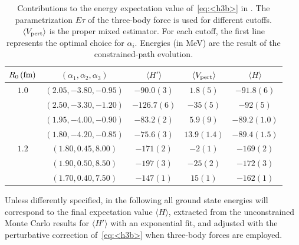 \documentclass[aps,prc,twocolumn,superscriptaddress,floatfix]{revtex4-1}
\begin{document}
\setlength{\tabcolsep}{1.5pt}
\begin{table}[htb]
\centering
\caption[]{Contributions to the energy expectation value of~\cref{eq:<h3b>} in .
The parametrization $E\tau$ of the three-body force is used for different cutoffs.
$\langle V_{\rm pert}\rangle$ is the proper mixed estimator. 
For each cutoff, the first line represents the optimal choice for $\alpha_i$.
Energies (in MeV) are the result of the constrained-path evolution.}
\begin{tabular}{ccccc}
\hline\hline
$R_0\,(\rm fm)$ & $(\alpha_1,\alpha_2,\alpha_3)$ & $\langle H'\rangle$ & $\langle V_{\rm pert}\rangle$ & $\langle H\rangle$ \\
\hline
$1.0$ & $(2.05,-3.80,-0.95)$ & $-90.0(3)$  & $1.8(5)$    & $-91.8(6)$   \\
      & $(2.50,-3.30,-1.20)$ & $-126.7(6)$ & $-35(5)$    & $-92(5)$     \\
      & $(1.95,-4.00,-0.90)$ & $-83.2(2)$  & $5.9(9)$    & $-89.2(1.0)$ \\
      & $(1.80,-4.20,-0.85)$ & $-75.6(3)$  & $13.9(1.4)$ & $-89.4(1.5)$ \\
\hline                        
$1.2$ & $(1.80,0.45,8.00)$   & $-171(2)$   & $-2(1)$     & $-169(2)$    \\
      & $(1.90,0.50,8.50)$   & $-197(3)$   & $-25(2)$    & $-172(3)$    \\
      & $(1.70,0.40,7.50)$   & $-147(1)$   & $15(1)$     & $-162(1)$    \\
\hline\hline
\end{tabular}
\label{tab:alpha}
\end{table}
\setlength{\tabcolsep}{10pt}

Unless differently specified, in the following all ground state energies will 
correspond to the final expectation value $\langle H\rangle$, extracted from 
the unconstrained Monte Carlo results for $\langle H'\rangle$ with an exponential fit, 
and adjusted with the perturbative correction of~\cref{eq:<h3b>} when three-body forces are employed.
\end{document}
